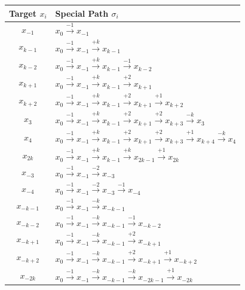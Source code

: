 \begin{center}
  \begin{tabular}{|c|l|}
 \hline
 Target $x_i$ & Special Path $\sigma_i$\\
 \hline
  $x_{-1}$ &  $x_{0}\xrightarrow {-1} x_{-1}$\\
  $x_{k-1}$ &  $x_{0}\xrightarrow {-1}x_{-1}\xrightarrow {+k}x_{k-1}$\\
  $x_{k-2}$ &  $x_{0} \xrightarrow {-1}x_{-1}\xrightarrow {+k}x_{k-1}\xrightarrow {-1}x_{k-2}$\\
  $x_{k+1}$ &  $x_{0} \xrightarrow {-1}x_{-1}\xrightarrow {+k}x_{k-1}\xrightarrow {+2}x_{k+1}$\\
  $x_{k+2}$ &  $x_{0} \xrightarrow {-1}x_{-1}\xrightarrow {+k}x_{k-1}\xrightarrow {+2}x_{k+1}\xrightarrow {+1}x_{k+2}$\\
  $x_{3}$ &  $x_{0} \xrightarrow {-1}x_{-1}\xrightarrow {+k}x_{k-1}\xrightarrow {+2}x_{k+1}\xrightarrow {+2}x_{k+3}\xrightarrow {-k}x_{3}$\\
  $x_{4}$ &  $x_{0} \xrightarrow {-1}x_{-1}\xrightarrow {+k}x_{k-1}\xrightarrow {+2}x_{k+1}\xrightarrow {+2}x_{k+3}\xrightarrow {+1}x_{k+4} \xrightarrow {-k}x_{4}$\\

$x_{2k}$ &   $ x_{0} \xrightarrow {-1} x_{-1} \xrightarrow {+k} x_{k-1} \xrightarrow {+k} x_{2k-1} \xrightarrow {+1}  x_{2k}$\\
  $x_{-3}$ &  $x_{0}\xrightarrow {-1}x_{-1}\xrightarrow {-2}x_{-3}$\\
  $x_{-4}$ &  $x_{0}\xrightarrow {-1}x_{-1}\xrightarrow {-2}x_{-3} \xrightarrow {-1}x_{-4}$\\
 $x_{-k-1}$ & $ x_{0} \xrightarrow {-1} x_{-1} \xrightarrow {-k} x_{-k-1}$\\
 $x_{-k-2}$ & $ x_{0} \xrightarrow {-1} x_{-1} \xrightarrow {-k} x_{-k-1} \xrightarrow {-1} x_{-k-2}$\\
 $x_{-k+1}$ & $ x_{0} \xrightarrow {-1} x_{-1} \xrightarrow {-k} x_{-k-1} \xrightarrow {+2} x_{-k+1}$\\
 $x_{-k+2}$ & $ x_{0} \xrightarrow {-1} x_{-1} \xrightarrow {-k} x_{-k-1} \xrightarrow {+2} x_{-k+1}\xrightarrow {+1} x_{-k+2}$\\

 $x_{-2k}$  & $x_{0} \xrightarrow {-1} x_{-1} \xrightarrow {-k} x_{-k-1} \xrightarrow {-k} x_{-2k-1} \xrightarrow {+1} x_{-2k}$\\
 \hline
 \end{tabular}
 \end{center}
 
